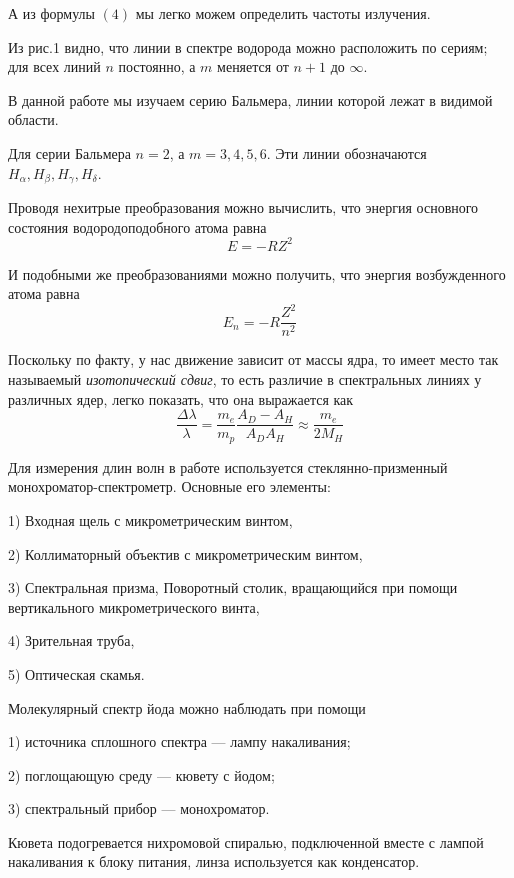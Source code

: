 \documentclass[a4paper, 12pt]{article}%
\begin{document}
А из формулы $(4)$ мы легко можем определить частоты излучения. 

Из рис.1 видно, что линии в спектре водорода можно расположить по сериям; для всех линий $n$ постоянно, а $m$ меняется от $n+1$ до $\infty$. 

В данной работе мы изучаем серию Бальмера, линии которой лежат в видимой области. 

Для серии Бальмера $n=2$, а $m = 3, 4, 5, 6$. Эти линии обозначаются $H_{\alpha}, H_{\beta}, H_{\gamma}, H_{\delta}$.

Проводя нехитрые преобразования можно вычислить, что энергия основного состояния водородоподобного атома равна
\begin{equation}
E = -RZ^2
\end{equation}

И подобными же преобразованиями можно получить, что энергия возбужденного атома равна 
\begin{equation}
E_n = -R\frac{Z^2}{n^2}
\end{equation}

Поскольку по факту, у нас движение зависит от массы ядра, то имеет место так называемый \textit{изотопический сдвиг}, то есть различие в спектральных линиях у различных ядер, легко показать, что она выражается как
\begin{equation}
\frac{\Delta \lambda}{\lambda} = \frac{m_e}{m_p}\frac{A_D - A_H}{A_DA_H} \approx \frac{m_e}{2M_H}
\end{equation}
\newpage

Для измерения длин волн в работе используется стеклянно-призменный монохроматор-спектрометр. 
Основные его элементы:

1) Входная щель с микрометрическим винтом, 

2) Коллиматорный объектив с микрометрическим винтом,
 
3) Спектральная призма, Поворотный столик, вращающийся при помощи вертикального микрометрического винта, 

4) Зрительная труба, 

5) Оптическая скамья.

Молекулярный спектр йода можно наблюдать при помощи 

1) источника сплошного спектра --- лампу накаливания;

2) поглощающую среду --- кювету с йодом;

3) спектральный прибор --- монохроматор.

Кювета подогревается нихромовой спиралью, подключенной вместе с лампой накаливания к блоку питания, линза используется как конденсатор.
\end{document}
